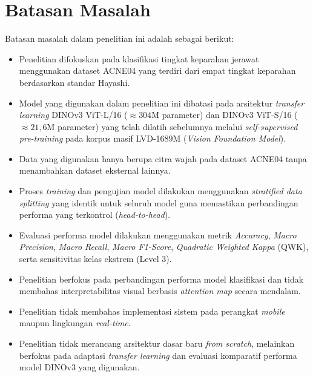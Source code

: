 \section{Batasan Masalah}

Batasan masalah dalam penelitian ini adalah sebagai berikut:

\begin{itemize}
    \item Penelitian difokuskan pada klasifikasi tingkat keparahan jerawat menggunakan dataset ACNE04 yang terdiri dari empat tingkat keparahan berdasarkan standar Hayashi.
    
    \item Model yang digunakan dalam penelitian ini dibatasi pada arsitektur \textit{transfer learning} DINOv3 ViT-L/16 ($\approx 304\text{M}$ parameter) dan DINOv3 ViT-S/16 ($\approx 21,6\text{M}$ parameter) yang telah dilatih sebelumnya melalui \textit{self-supervised pre-training} pada korpus masif LVD-1689M (\textit{Vision Foundation Model}).
    
    \item Data yang digunakan hanya berupa citra wajah pada dataset ACNE04 tanpa menambahkan dataset eksternal lainnya.
    
    \item Proses \textit{training} dan pengujian model dilakukan menggunakan \textit{stratified data splitting} yang identik untuk seluruh model guna memastikan perbandingan performa yang terkontrol (\textit{head-to-head}).
    
    \item Evaluasi performa model dilakukan menggunakan metrik \textit{Accuracy}, \textit{Macro Precision}, \textit{Macro Recall}, \textit{Macro F1-Score}, \textit{Quadratic Weighted Kappa} (QWK), serta sensitivitas kelas ekstrem (Level 3).
    
    \item Penelitian berfokus pada perbandingan performa model klasifikasi dan tidak membahas interpretabilitas visual berbasis \textit{attention map} secara mendalam.
    
    \item Penelitian tidak membahas implementasi sistem pada perangkat \textit{mobile} maupun lingkungan \textit{real-time}.
    
    \item Penelitian tidak merancang arsitektur dasar baru \textit{from scratch}, melainkan berfokus pada adaptasi \textit{transfer learning} dan evaluasi komparatif performa model DINOv3 yang digunakan.
\end{itemize}

